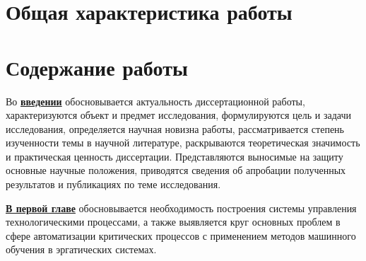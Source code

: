 
\section*{Общая характеристика работы}

\newcommand{\actuality}{\underline{\textbf{\actualityTXT}}}
\newcommand{\progress}{\underline{\textbf{\progressTXT}}}
\newcommand{\aim}{\underline{{\textbf\aimTXT}}}
\newcommand{\tasks}{\underline{\textbf{\tasksTXT}}}
\newcommand{\novelty}{\underline{\textbf{\noveltyTXT}}}
\newcommand{\influence}{\underline{\textbf{\influenceTXT}}}
\newcommand{\methods}{\underline{\textbf{\methodsTXT}}}
\newcommand{\defpositions}{\underline{\textbf{\defpositionsTXT}}}
\newcommand{\reliability}{\underline{\textbf{\reliabilityTXT}}}
\newcommand{\probation}{\underline{\textbf{\probationTXT}}}
\newcommand{\contribution}{\underline{\textbf{\contributionTXT}}}
\newcommand{\publications}{\underline{\textbf{\publicationsTXT}}}




\section*{Содержание работы}
Во \underline{\textbf{введении}} обосновывается актуальность диссертационной работы, характеризуются объект и предмет исследования,  формулируются цель и задачи исследования, определяется научная новизна работы, рассматривается степень изученности темы в научной литературе, раскрываются теоретическая значимость и практическая ценность диссертации. Представляются выносимые на защиту основные научные положения, приводятся сведения об апробации полученных результатов и публикациях по теме исследования.


\underline{\textbf{В первой главе}} обосновывается необходимость построения системы управления технологическими процессами, а также выявляется круг основных проблем  в сфере автоматизации критических процессов с применением методов машинного обучения в эргатических системах.

